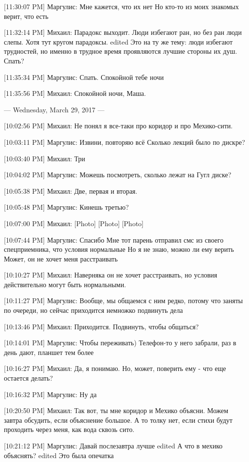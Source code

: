 \documentclass{article}
\begin{document}
[11:30:07 PM] Маргулис:
Мне кажется, что их нет
 Но кто-то из моих знакомых верит, что есть

[11:32:14 PM] Михаил:
Парадокс выходит. Люди избегают ран, но без ран люди слепы. Хотя тут кругом парадоксы.
edited 
Это на ту же тему: люди избегают трудностей, но именно в трудное время проявляются лучшие стороны их душ.
 Спать?

[11:35:34 PM] Маргулис:
Спать.
 Спокойной тебе ночи

[11:35:56 PM] Михаил:
Спокойной ночи, Маша.

--- Wednesday, March 29, 2017 ---

[10:02:56 PM] Михаил:
Не понял я все-таки про коридор и про Мехико-сити.

[10:03:11 PM] Маргулис:
Извини, повторяю всё
 Сколько лекций было по дискре?

[10:03:40 PM] Михаил:
Три

[10:04:02 PM] Маргулис:
Можешь посмотреть, сколько лежат на Гугл диске?

[10:05:38 PM] Михаил:
Две, первая и вторая.

[10:05:48 PM] Маргулис:
Кинешь третью?


[10:07:00 PM] Михаил:
[Photo]
 [Photo]
 [Photo]

[10:07:44 PM] Маргулис:
Спасибо
 Мне тот парень отправил смс из своего спецприемника, что условия нормальные
 Но я не знаю, можно ли ему верить
 Может, он не хочет меня расстраивать

[10:10:27 PM] Михаил:
Наверняка он не хочет расстраивать, но условия действительно могут быть нормальными.

[10:11:27 PM] Маргулис:
Вообще, мы общаемся с ним редко, потому что заняты по очереди, но сейчас приходится немножко подвинуть дела

[10:13:46 PM] Михаил:
Приходится. Подвинуть, чтобы общаться?

[10:14:01 PM] Маргулис:
Чтобы переживать)
 Телефон-то у него забрали, раз в день дают, планшет тем более

[10:16:27 PM] Михаил:
Да, я понимаю. Но, может, поверить ему - что еще остается делать?

[10:16:32 PM] Маргулис:
Ну да

[10:20:50 PM] Михаил:
Так вот, ты мне коридор и Мехико объясни. Можем завтра обсудить, если объяснение большое. А то толку нет, если стихи будут проходить через меня, как вода сквозь сито.

[10:21:12 PM] Маргулис:
Давай послезавтра лучше
edited 
А что в мехико объяснять?
edited 
Это была опечатка
\end{document}
